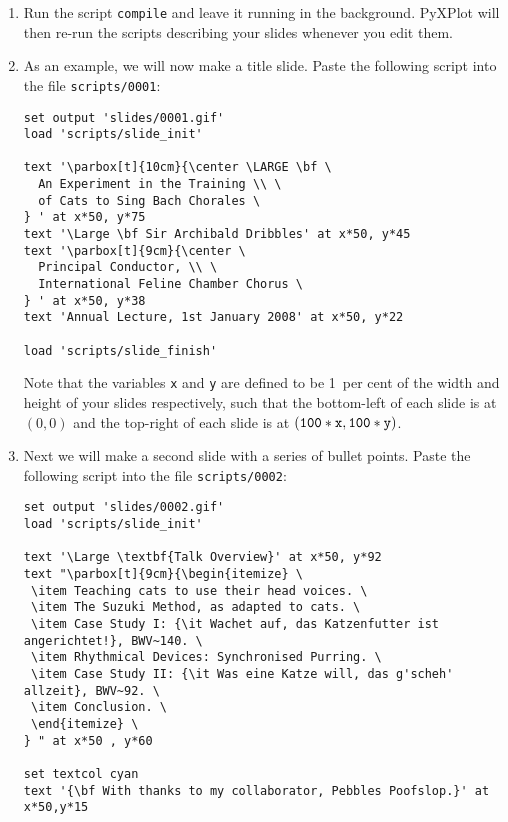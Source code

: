 \begin{enumerate}
\item Run the script {\tt compile} and leave it running in the background.
PyXPlot will then re-run the scripts describing your slides whenever you edit
them.
\item As an example, we will now make a title slide. Paste the following script
into the file {\tt scripts/0001}:
\begin{verbatim}
set output 'slides/0001.gif'
load 'scripts/slide_init'

text '\parbox[t]{10cm}{\center \LARGE \bf \
  An Experiment in the Training \\ \
  of Cats to Sing Bach Chorales \
} ' at x*50, y*75
text '\Large \bf Sir Archibald Dribbles' at x*50, y*45
text '\parbox[t]{9cm}{\center \
  Principal Conductor, \\ \
  International Feline Chamber Chorus \
} ' at x*50, y*38
text 'Annual Lecture, 1st January 2008' at x*50, y*22

load 'scripts/slide_finish'
\end{verbatim}
Note that the variables {\tt x} and {\tt y} are defined to be 1~per cent of the
width and height of your slides respectively, such that the bottom-left of each
slide is at $(0,0)$ and the top-right of each slide is at $({\tt 100*x},{\tt
100*y})$.
\item Next we will make a second slide with a series of bullet points. Paste
the following script into the file {\tt scripts/0002}:
\begin{verbatim}
set output 'slides/0002.gif'
load 'scripts/slide_init'

text '\Large \textbf{Talk Overview}' at x*50, y*92
text "\parbox[t]{9cm}{\begin{itemize} \
 \item Teaching cats to use their head voices. \
 \item The Suzuki Method, as adapted to cats. \
 \item Case Study I: {\it Wachet auf, das Katzenfutter ist angerichtet!}, BWV~140. \
 \item Rhythmical Devices: Synchronised Purring. \
 \item Case Study II: {\it Was eine Katze will, das g'scheh' allzeit}, BWV~92. \
 \item Conclusion. \
 \end{itemize} \
} " at x*50 , y*60

set textcol cyan
text '{\bf With thanks to my collaborator, Pebbles Poofslop.}' at x*50,y*15


\end{verbatim}
\end{enumerate}
